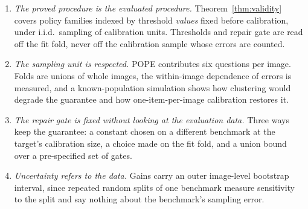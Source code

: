 \begin{enumerate}
\item \emph{The proved procedure is the evaluated procedure.} Theorem~\ref{thm:validity} covers policy families indexed by threshold
  \emph{values} fixed before calibration, under i.i.d.\ sampling of calibration units. Thresholds and repair gate are read off the fit fold,
  never off the calibration sample whose errors are counted.
\item \emph{The sampling unit is respected.} POPE contributes six questions per image. Folds are unions of whole images, the within-image
  dependence of errors is measured, and a known-population simulation shows how clustering would degrade the guarantee and how
  one-item-per-image calibration restores it.
\item \emph{The repair gate is fixed without looking at the evaluation data.} Three ways keep the guarantee: a constant chosen on a
  different benchmark at the target's calibration size, a choice made on the fit fold, and a union bound over a pre-specified set of gates.
\item \emph{Uncertainty refers to the data.} Gains carry an outer image-level bootstrap interval, since repeated random splits of one
  benchmark measure sensitivity to the split and say nothing about the benchmark's sampling error.
\end{enumerate}

